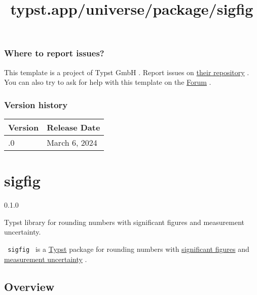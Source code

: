 \subsubsection{Where to report issues?}\label{where-to-report-issues}

This template is a project of Typst GmbH . Report issues on
\href{https://github.com/typst/templates}{their repository} . You can
also try to ask for help with this template on the
\href{https://forum.typst.app}{Forum} .

\label{versions}
\subsubsection{Version history}\label{version-history}

\begin{longtable}[]{@{}ll@{}}
\toprule\noalign{}
Version & Release Date \\
\midrule\noalign{}
\endhead
\bottomrule\noalign{}
\endlastfoot
0.1.0 & March 6, 2024 \\
\end{longtable}


\title{typst.app/universe/package/sigfig}

\label{banner}
\section{sigfig}\label{sigfig}

{ 0.1.0 }

Typst library for rounding numbers with significant figures and
measurement uncertainty.

\label{readme}
\texttt{\ sigfig\ } is a \href{https://typst.app/}{Typst} package for
rounding numbers with
\href{https://en.wikipedia.org/wiki/Significant_figures}{significant
figures} and
\href{https://en.wikipedia.org/wiki/Measurement_uncertainty}{measurement
uncertainty} .

\subsection{Overview}\label{overview}

\begin{Shaded}
\begin{Highlighting}[]

\end{Highlighting}
\end{Shaded}

